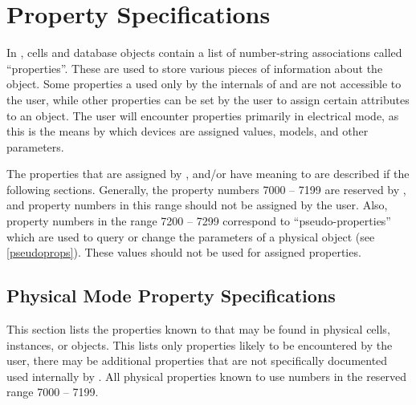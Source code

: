 
\chapter{Property Specifications}
\label{prptyspec}

In {\Xic}, cells and database objects contain a list of number-string
associations called ``properties''.  These are used to store various
pieces of information about the object.  Some properties a used only
by the internals of {\Xic} and are not accessible to the user, while
other properties can be set by the user to assign certain attributes
to an object.  The user will encounter properties primarily in electrical
mode, as this is the means by which devices are assigned values, models,
and other parameters.

The properties that are assigned by {\Xic}, and/or have meaning to
{\Xic} are described if the following sections.  Generally, the
property numbers 7000 -- 7199 are reserved by {\Xic}, and property
numbers in this range should not be assigned by the user.  Also,
property numbers in the range 7200 -- 7299 correspond to
``pseudo-properties'' which are used to query or change the parameters
of a physical object (see \ref{pseudoprops}).  These values should not
be used for assigned properties.


\section{Physical Mode Property Specifications}
\label{physpropfmt}

This section lists the properties known to {\Xic} that may be found in
physical cells, instances, or objects.  This lists only properties
likely to be encountered by the user, there may be additional
properties that are not specifically documented used internally by
{\Xic}.  All physical properties known to {\Xic} use numbers in the
reserved range 7000 -- 7199.

